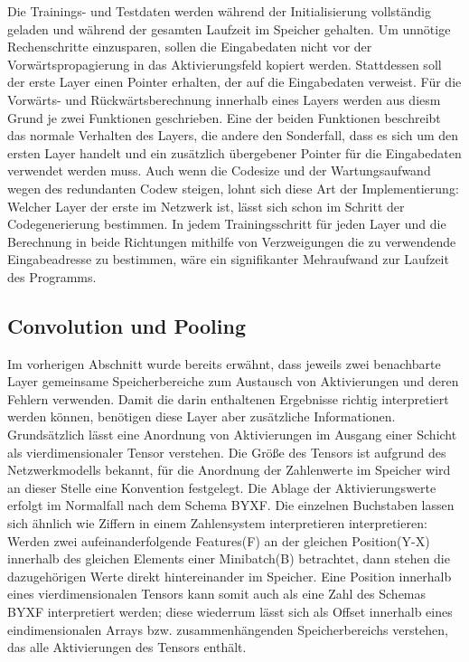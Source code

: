 \documentclass[../main.tex]{subfiles}
\begin{document}
Die Trainings- und Testdaten werden während der Initialisierung vollständig geladen und während der gesamten Laufzeit im Speicher gehalten. Um unnötige Rechenschritte einzusparen, sollen die Eingabedaten nicht vor der Vorwärtspropagierung in das Aktivierungsfeld kopiert werden. Stattdessen soll der erste Layer einen Pointer erhalten, der auf die Eingabedaten verweist. Für die Vorwärts- und Rückwärtsberechnung innerhalb eines Layers werden aus diesm Grund je zwei Funktionen geschrieben. Eine der beiden Funktionen beschreibt das normale Verhalten des Layers, die andere den Sonderfall, dass es sich um den ersten Layer handelt und ein zusätzlich übergebener Pointer für die Eingabedaten verwendet werden muss. Auch wenn die Codesize und der Wartungsaufwand wegen des redundanten Codew steigen, lohnt sich diese Art der Implementierung: Welcher Layer der erste im Netzwerk ist, lässt sich schon im Schritt der Codegenerierung bestimmen. In jedem Trainingsschritt für jeden Layer und die Berechnung in beide Richtungen mithilfe von Verzweigungen die zu verwendende Eingabeadresse zu bestimmen, wäre ein signifikanter Mehraufwand zur Laufzeit des Programms. 

\subsection{Convolution und Pooling} \label{xeonphi:convnpool}
Im vorherigen Abschnitt wurde bereits erwähnt, dass jeweils zwei benachbarte Layer gemeinsame Speicherbereiche zum Austausch von Aktivierungen und deren Fehlern verwenden. Damit die darin enthaltenen Ergebnisse richtig interpretiert werden können, benötigen diese Layer aber zusätzliche Informationen. Grundsätzlich lässt eine Anordnung von Aktivierungen im Ausgang einer Schicht als vierdimensionaler Tensor verstehen. Die Größe des Tensors ist aufgrund des Netzwerkmodells bekannt, für die Anordnung der Zahlenwerte im Speicher wird an dieser Stelle eine Konvention festgelegt. Die Ablage der Aktivierungswerte erfolgt im Normalfall nach dem Schema BYXF. Die einzelnen Buchstaben lassen sich ähnlich wie Ziffern in einem Zahlensystem interpretieren interpretieren: Werden zwei aufeinanderfolgende Features(F) an der gleichen Position(Y-X) innerhalb des gleichen Elements einer Minibatch(B) betrachtet, dann stehen die dazugehörigen Werte direkt hintereinander im Speicher. Eine Position innerhalb eines vierdimensionalen Tensors kann somit auch als eine Zahl des Schemas BYXF interpretiert werden; diese wiederrum lässt sich als Offset innerhalb eines eindimensionalen Arrays bzw. zusammenhängenden Speicherbereichs verstehen, das alle Aktivierungen des Tensors enthält. 
\end{document}
